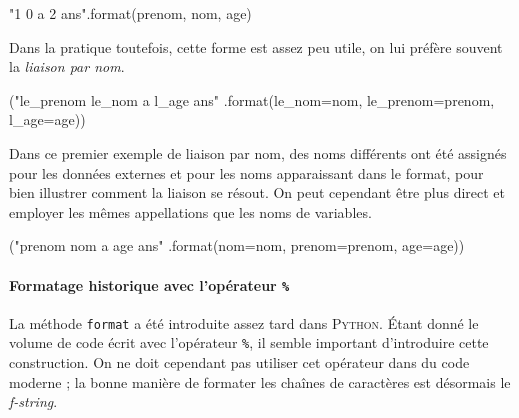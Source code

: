 \begin{idleconsole}
	\begin{pyconsole}
		"{1} {0} a {2} ans".format(prenom, nom, age)
	\end{pyconsole}
\end{idleconsole}

Dans la pratique toutefois, cette forme est assez peu utile, on lui préfère souvent la \emph{liaison par nom}.

\begin{idleconsole}
\begin{pyconsole}
("{le_prenom} {le_nom} a {l_age} ans"
.format(le_nom=nom, le_prenom=prenom, l_age=age))
\end{pyconsole}
\end{idleconsole}

Dans ce premier exemple de liaison par nom, des noms différents ont été assignés pour les données externes et pour les noms apparaissant dans le format, pour bien illustrer comment la liaison se résout. %
On peut cependant être plus direct et employer les mêmes appellations que les noms de variables.

\begin{idleconsole}
\begin{pyconsole}
("{prenom} {nom} a {age} ans"
.format(nom=nom, prenom=prenom, age=age))
\end{pyconsole}
\end{idleconsole}

\vspace{-0.5pt}%

\paragraph{Formatage historique avec l'opérateur {\normalfont\texttt{\%}}}
La méthode \texttt{format} a été introduite assez tard dans \textsc{Python}. %
Étant donné le volume de code écrit avec l'opérateur \texttt{\%}, \nopagebreak il semble important d'introduire cette construction. On ne doit cependant pas utiliser cet opérateur dans du code moderne ; la bonne manière de formater les chaînes de caractères est désormais le \textit{f-string}.

